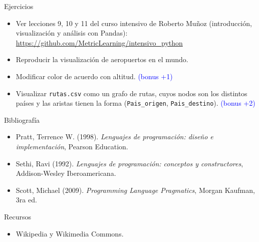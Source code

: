 \documentclass[handout]{beamer} %
\newcommand{\blue}[1]{\textcolor{blue}{#1}}
\begin{document}
\begin{frame}{Ejercicios}
  \begin{itemize}
    \item Ver lecciones 9, 10 y 11 del curso intensivo de Roberto Muñoz (introducción, visualización y análisis con Pandas):\\ {\scriptsize \blue{\url{https://github.com/MetricLearning/intensivo_python}}}
    \item Reproducir la visualización de aeropuertos en el mundo.
    \item Modificar color de acuerdo con altitud. \blue{(bonus +1)}
    \item Visualizar \texttt{rutas.csv} como un grafo de rutas, cuyos nodos son los distintos países y las aristas tienen la forma (\texttt{Pais\_origen}, \texttt{Pais\_destino}). \blue{(bonus +2)}
  \end{itemize}
\end{frame}


\begin{frame}
 \begin{block}{Bibliografía}
  \begin{itemize}
    \item Pratt, Terrence W. (1998). \textit{Lenguajes de programación: diseño e implementación}, Pearson Education.
    \item Sethi, Ravi (1992). \textit{Lenguajes de programación: conceptos y constructores}, Addison-Wesley Iberoamericana.
    \item Scott, Michael (2009). \textit{Programming Language Pragmatics}, Morgan Kaufman, 3ra ed.
  \end{itemize}
 \end{block}
 \begin{block}{Recursos}
  \begin{itemize}
    \item Wikipedia y Wikimedia Commons.
  \end{itemize}
 \end{block}
\end{frame}
\end{document}
